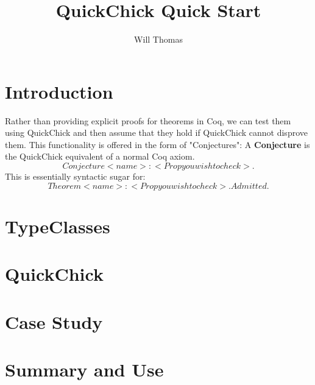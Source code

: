 \documentclass{article}
\title{\textbf{QuickChick Quick Start}}
\author{Will Thomas}
\begin{document}
    \maketitle

    \section{Introduction}
    Rather than providing explicit proofs for theorems in Coq, we can test them using QuickChick and then assume that they hold if QuickChick cannot disprove them. This functionality is offered in the form of "Conjectures": 
    A \textbf{Conjecture} is the QuickChick equivalent of a normal Coq axiom.
    $$ Conjecture <name> : <Prop you wish to check>.$$ 
    This is essentially syntactic sugar for:
    $$ Theorem <name> : <Prop you wish to check>. Admitted.$$

    \section{TypeClasses}

    \section{QuickChick}

    \section{Case Study}

    \section{Summary and Use}
\end{document}

